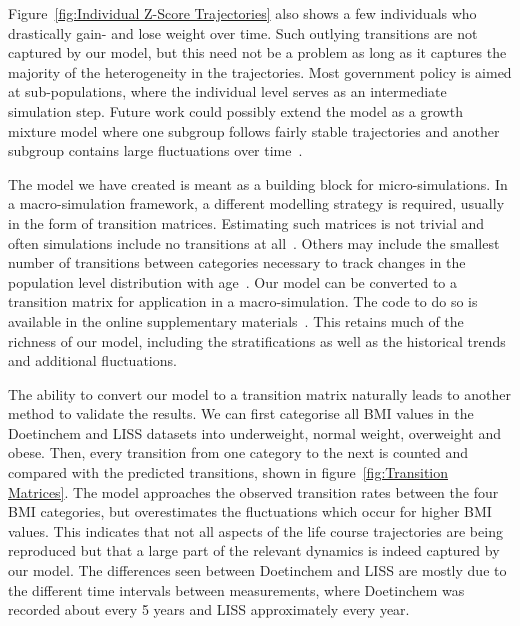 \documentclass{imammb}
\numberwithin{equation}{section}
\begin{document}
Figure~\ref{fig:Individual Z-Score Trajectories} also shows a few individuals who drastically gain- and lose weight over time. Such outlying transitions are not captured by our model, but this need not be a problem as long as it captures the majority of the heterogeneity in the trajectories. Most government policy is aimed at sub-populations, where the individual level serves as an intermediate simulation step. Future work could possibly extend the model as a growth mixture model where one subgroup follows fairly stable trajectories and another subgroup contains large fluctuations over time~\citep{Herle2020}. %

The model we have created is meant as a building block for micro-simulations. In a macro-simulation framework, a different modelling strategy is required, usually in the form of transition matrices. Estimating such matrices is not trivial and often simulations include no transitions at all~\citep{Hendriksen2015}. Others may include the smallest number of transitions between categories necessary to track changes in the population level distribution with age~\citep{VandeKassteele2012}. Our model can be converted to a transition matrix for application in a macro-simulation. The code to do so is available in the online supplementary materials~\citep{Bogaardt2023}. This retains much of the richness of our model, including the stratifications as well as the historical trends and additional fluctuations.

The ability to convert our model to a transition matrix naturally leads to another method to validate the results. We can first categorise all BMI values in the Doetinchem and LISS datasets into underweight, normal weight, overweight and obese. Then, every transition from one category to the next is counted and compared with the predicted transitions, shown in figure~\ref{fig:Transition Matrices}. The model approaches the observed transition rates between the four BMI categories, but overestimates the fluctuations which occur for higher BMI values. This indicates that not all aspects of the life course trajectories are being reproduced but that a large part of the relevant dynamics is indeed captured by our model. The differences seen between Doetinchem and LISS are mostly due to the different time intervals between measurements, where Doetinchem was recorded about every 5 years and LISS approximately every year.

\vspace{-4mm}
\end{document}
